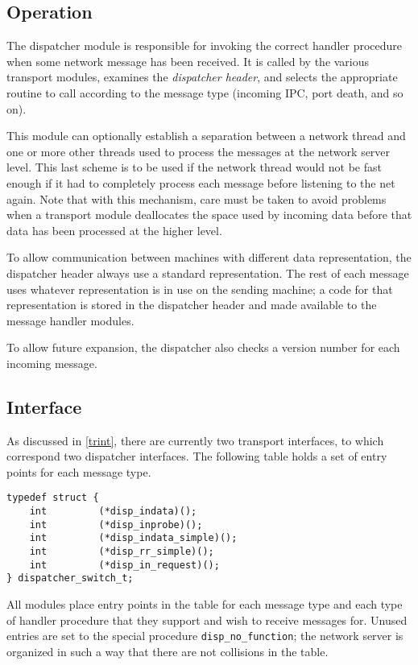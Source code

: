 \subsection{Operation}
The dispatcher module is responsible for invoking the correct handler
procedure when some network message has been received.  It is called by the
various transport modules, examines the {\it dispatcher header}, and selects
the appropriate routine to call according to the message type (incoming IPC,
port death, and so on). 

This module can optionally establish a separation between a network thread
and one or more other threads used to process the messages at the network
server level.  This last scheme is to be used if the network thread would
not be fast enough if it had to completely process each message before
listening to the net again. Note that with this mechanism, care must
be taken to avoid problems when a transport module deallocates the
space used by incoming data before that data has been processed at the
higher level.

To allow communication between machines with different data representation,
the dispatcher header always use a standard representation.  The rest of
each message uses whatever representation is in use on the sending machine;
a code for that representation is stored in the dispatcher header and made
available to the message handler modules.

To allow future expansion, the dispatcher also checks a version number
for each incoming message.

\subsection{Interface}
As discussed in \ref{trint}, there are currently two transport
interfaces, to which correspond two dispatcher interfaces. The
following table holds a set of entry points for each message type.
\begin{verbatim}
typedef struct {
    int         (*disp_indata)();
    int         (*disp_inprobe)();
    int         (*disp_indata_simple)();
    int         (*disp_rr_simple)();
    int         (*disp_in_request)();
} dispatcher_switch_t;
\end{verbatim}

All modules place entry points in the table for each message type and
each type of handler procedure that they support and wish to receive
messages for. Unused entries are set to the special procedure
\verb"disp_no_function"; the network server is organized in such a way
that there are not collisions in the table.

